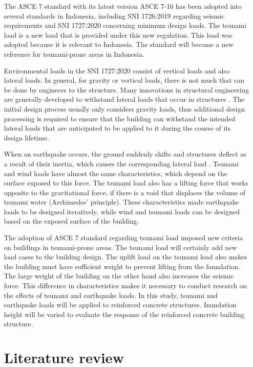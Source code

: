 \documentclass{cup-pan}
\begin{document}
The ASCE 7 standard with its latest version ASCE 7-16 has been adopted into several standards in Indonesia, including SNI 1726:2019 regarding seismic requirements and SNI 1727:2020 concerning minimum design loads. The tsunami load is a new load that is provided under this new regulation. This load was adopted because it is relevant to Indonesia. The standard will become a new reference for tsunami-prone areas in Indonesia.

Environmental loads in the SNI 1727:2020 consist of vertical loads and also lateral loads. In general, for gravity or vertical loads, there is not much that can be done by engineers to the structure. Many innovations in structural engineering are generally developed to withstand lateral loads that occur in structures \citep{taranath}. The initial design process usually only considers gravity loads, thus additional design processing is required to ensure that the building can withstand the intended lateral loads that are anticipated to be applied to it during the course of its design lifetime.

When an earthquake occurs, the ground suddenly shifts and structures deflect as a result of their inertia, which causes the corresponding lateral load \citep{taranath}. Tsunami and wind loads have almost the same characteristics, which depend on the surface exposed to this force. The tsunami load also has a lifting force that works opposite to the gravitational force, if there is a void that displaces the volume of tsunami water (Archimedes’ principle). These characteristics made earthquake loads to be designed iteratively, while wind and tsunami loads can be designed based on the exposed surface of the building.

The adoption of ASCE 7 standard regarding tsunami load imposed new criteria on buildings in tsunami-prone areas. The tsunami load will certainly add new load cases to the building design. The uplift load on the tsunami load also makes the building must have sufficient weight to prevent lifting from the foundation. The large weight of the building on the other hand also increases the seismic force. This difference in characteristics makes it necessary to conduct research on the effects of tsunami and earthquake loads. In this study, tsunami and earthquake loads will be applied to reinforced concrete structures. Inundation height will be varied to evaluate the response of the reinforced concrete building structure.

\section{Literature review}
\label{sec:litview}
\end{document}
